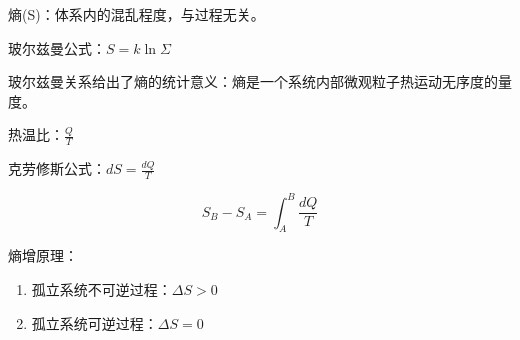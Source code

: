 熵(S)：体系内的混乱程度，与过程无关。

玻尔兹曼公式：$S=\mathit{k}\ln{\Sigma}$

玻尔兹曼关系给出了熵的统计意义：熵是一个系统内部微观粒子热运动无序度的量度。

热温比：$\frac{Q}{T}$

克劳修斯公式：$dS=\frac{dQ}{T}$

\begin{equation}
    S_B-S_A=\int_A^B{\frac{dQ}{T}}
\end{equation}

熵增原理：
\begin{enumerate}
    \item 孤立系统不可逆过程：$\Delta{S}>0$
    \item 孤立系统可逆过程：$\Delta{S}=0$
\end{enumerate}